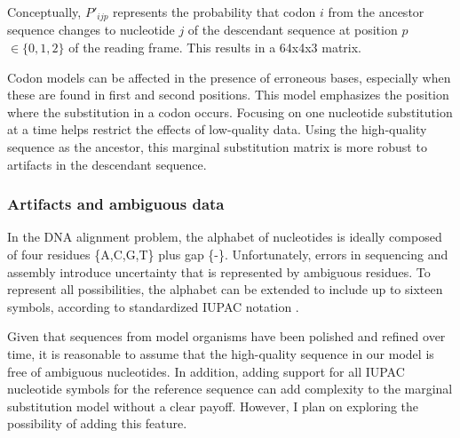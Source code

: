 Conceptually, $P'_{ijp}$ represents the probability that codon $i$ from the
ancestor sequence changes to nucleotide $j$ of the descendant sequence at
position $p$ $\in \{0,1,2\}$ of the reading frame.
This results in a 64x4x3 matrix.

Codon models can be affected in the presence of erroneous bases, especially
when these are found in first and second positions.
This model emphasizes the position where the substitution in a codon occurs.
Focusing on one nucleotide substitution at a time helps restrict the effects of
low-quality data.
Using the high-quality sequence as the ancestor, this marginal substitution
matrix is more robust to artifacts in the descendant sequence.


\subsubsection{Artifacts and ambiguous data}



In the DNA alignment problem, the alphabet of nucleotides is ideally composed
of four residues \{A,C,G,T\} plus gap \{-\}.
Unfortunately, errors in sequencing and assembly introduce uncertainty that is
represented by ambiguous residues.
To represent all possibilities, the alphabet can be extended to include up to
sixteen symbols, according to standardized IUPAC notation
\parencite{cornish_1985_nomenclature}.


Given that sequences from model organisms have been polished and refined over
time, it is reasonable to assume that the high-quality sequence in our model is
free of ambiguous nucleotides.
In addition, adding support for all IUPAC nucleotide symbols for the reference
sequence can add complexity to the marginal substitution model without a clear
payoff.
However, I plan on exploring the possibility of adding this feature.

